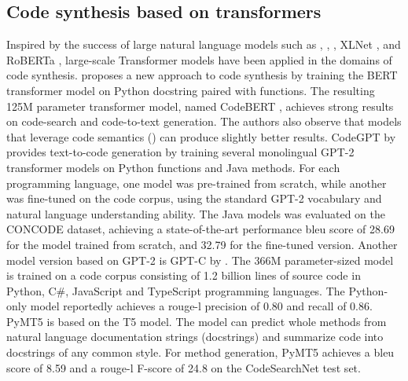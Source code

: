\subsection{Code synthesis based on transformers}
\label{sec:transformers-for-code-synthesis}
Inspired by the success of large natural language models such as  \cite{peters2018deep},  \cite{radford2018improving},  \cite{devlin2018bert}, XLNet \cite{yang2019xlnet}, and RoBERTa \cite{liu2019roberta}, large-scale Transformer models have been applied in the domains of code synthesis. \textcite{feng2020codebert} proposes a new approach to code synthesis by training the BERT transformer model on Python \gls{docstring} paired with functions. The resulting 125M parameter transformer model, named CodeBERT \cite{feng2020codebert}, achieves strong results on code-search and code-to-text generation. The authors also observe that models that leverage code semantics () can produce slightly better results. CodeGPT by \cite{lu2021codexglue} provides text-to-code generation by training several monolingual GPT-2 transformer models on Python functions and Java methods. For each programming language, one model was pre-trained from scratch, while another was fine-tuned on the code corpus, using the standard GPT-2 vocabulary and natural language understanding ability. The Java models was evaluated on the CONCODE  dataset, achieving a state-of-the-art performance \acrshort{bleu} score \cite{papineni2002bleu} of 28.69 for the model trained from scratch, and 32.79 for the fine-tuned version. Another model version based on GPT-2 is GPT-C by \textcite{svyatkovskiy2020intellicode}. The 366M parameter-sized model is trained on a code corpus consisting of 1.2 billion lines of source code in Python, C\#, JavaScript and TypeScript programming languages. The Python-only model reportedly achieves a \gls{rouge-l} precision of 0.80 and recall of 0.86. PyMT5 \textcite{colin2020pymt5} is based on the T5 model. The model can predict whole methods from natural language documentation strings (docstrings) and summarize code into docstrings of any common style. For method generation, PyMT5 achieves a \gls{bleu} score of 8.59 and a \gls{rouge-l} F-score of 24.8 on the CodeSearchNet  test set.

